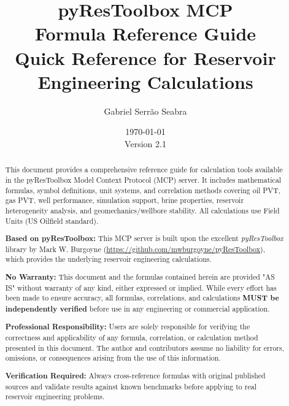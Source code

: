 \documentclass[11pt,a4paper]{article}
\title{
    \vspace{-2cm}
    \Huge\textbf{pyResToolbox MCP} \\
    \LARGE Formula Reference Guide \\
    \vspace{0.5cm}
    \large Quick Reference for Reservoir Engineering Calculations
}
\author{Gabriel Serrão Seabra}
\date{\today \\ \vspace{0.5cm} Version 2.1}
\begin{document}
\maketitle

\begin{abstract}
This document provides a comprehensive reference guide for calculation tools available in the pyResToolbox Model Context Protocol (MCP) server. It includes mathematical formulas, symbol definitions, unit systems, and correlation methods covering oil PVT, gas PVT, well performance, simulation support, brine properties, reservoir heterogeneity analysis, and geomechanics/wellbore stability. All calculations use Field Units (US Oilfield standard).

\vspace{0.5cm}

\textbf{Based on pyResToolbox:} This MCP server is built upon the excellent \textit{pyResToolbox} library by Mark W. Burgoyne (\url{https://github.com/mwburgoyne/pyResToolbox}), which provides the underlying reservoir engineering calculations.

\vspace{0.5cm}

\begin{tcolorbox}[colback=gray!5!white,colframe=black!75,title=\textbf{DISCLAIMER}]
\textbf{No Warranty:} This document and the formulas contained herein are provided "AS IS" without warranty of any kind, either expressed or implied. While every effort has been made to ensure accuracy, all formulas, correlations, and calculations \textbf{MUST be independently verified} before use in any engineering or commercial application.

\textbf{Professional Responsibility:} Users are solely responsible for verifying the correctness and applicability of any formula, correlation, or calculation method presented in this document. The author and contributors assume no liability for errors, omissions, or consequences arising from the use of this information.

\textbf{Verification Required:} Always cross-reference formulas with original published sources and validate results against known benchmarks before applying to real reservoir engineering problems.
\end{tcolorbox}
\end{abstract}

\newpage

\tableofcontents
\newpage

\end{document}
